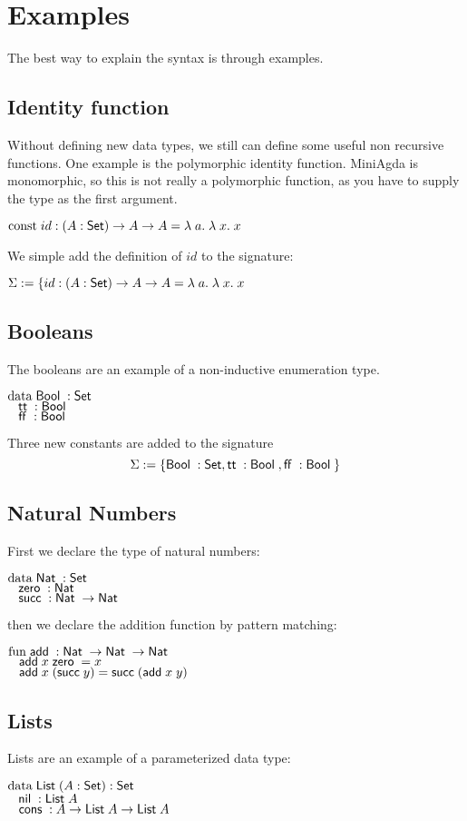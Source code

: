 \section{Examples}
The best way to explain the syntax is through examples.
\subsection{Identity function}
Without defining new data types, we still can define some useful non recursive functions.
One example is the polymorphic identity function. 
MiniAgda is monomorphic, so this is not really a polymorphic function, as you have to supply the
type as the first argument.
\begin{bsp}
$\mathrm{const}\; id : ( A : \mathsf{Set} ) \rightarrow{A \rightarrow A} = \lambda\; a .\;\lambda\; x .\;x$   
\end{bsp}
We simple add the definition of $id$ to the signature:
\begin{bsp}
$\Sigma := \{ id : ( A : \mathsf{Set} ) \rightarrow{A \rightarrow A} = \lambda\; a .\;\lambda\; x .\;x$
\end{bsp}
\subsection{Booleans}
The booleans are an example of a non-inductive enumeration type.
\begin{bsp}
$\mathrm{data}\; \mathsf{Bool}\; : \mathsf{Set}$  \\
$\hspace*{3mm} \mathsf{tt}\; : \mathsf{Bool}\; $\\
$\hspace*{3mm} \mathsf{ff}\; : \mathsf{Bool}\; $
\end{bsp}
Three new constants are added to the signature
\[ \Sigma := \{ \mathsf{Bool}\; : \mathsf{Set} , \mathsf{tt}\; : \mathsf{Bool}\; , \mathsf{ff}\; : \mathsf{Bool}\; \} \]
\subsection{Natural Numbers}
First we declare the type of natural numbers:
\begin{bsp}
$\mathrm{data}\; \mathsf{Nat}\; : \mathsf{Set}$ \\
$\hspace*{3mm} \mathsf{zero}\; : \mathsf{Nat}\; $\\
$\hspace*{3mm} \mathsf{succ}\; : \mathsf{Nat}\; \rightarrow \mathsf{Nat}\;$
\end{bsp}
then we declare the addition function by pattern matching:
\begin{bsp}
$\mathrm{fun}\; \mathsf{add}\; : \mathsf{Nat}\; \rightarrow \mathsf{Nat}\; \rightarrow \mathsf{Nat}\;$\\
$\hspace*{3mm} \mathsf{add}\; x \; \mathsf{zero}\; = x $\\
$\hspace*{3mm} \mathsf{add}\; x \; (\mathsf{succ}\; y) = \mathsf{succ}\; (\mathsf{add}\; x \; y)  $
\end{bsp}
\subsection{Lists}
Lists are an example of a parameterized data type:
\begin{bsp}
$\mathrm{data}\; \mathsf{List}\; ( A : \mathsf{Set} ) : \mathsf{Set} $ \\
$ \hspace*{3mm} \mathsf{nil}\; : \mathsf{List}\; A  $\\
$ \hspace*{3mm} \mathsf{cons}\; : A \rightarrow \mathsf{List}\; A \rightarrow \mathsf{List}\; A $
\end{bsp}
